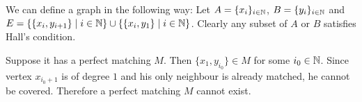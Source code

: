 \newcommand{\sheet}{1}




\maketitle

\begin{exercise}{1}
    We can define a graph in the following way:
    Let $A = \{x_i\}_{i \in \mathbb{N}}$, $B = \{y_i\}_{i \in \mathbb{N}}$ and $E = \{ \{x_i,
    y_{i+1} \} \mid i \in \mathbb{N} \} \cup \{ \{x_i, y_1\} \mid i \in \mathbb{N} \}$. Clearly
    any subset of $A$ or $B$ satisfies Hall's condition.

    Suppose it has a perfect matching $M$. Then $\{x_1, y_{i_0}\} \in M$ for
    some $i_0 \in \mathbb{N}$. Since vertex $x_{i_0 + 1}$ is of degree $1$ and his only
    neighbour is already matched, he cannot be covered. Therefore a perfect
    matching $M$ cannot exist.
\end{exercise}

